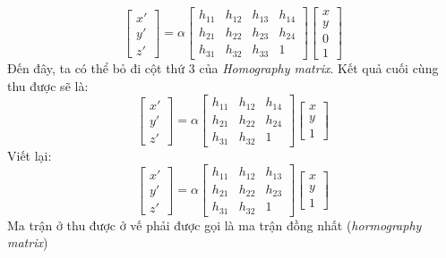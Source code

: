 \documentclass{article}
\begin{document}
\begin{equation}
\begin{bmatrix}
    x'\\y'\\z'
\end{bmatrix} = \alpha \begin{bmatrix}
    h_{11}&h_{12}&h_{13}&h_{14}\\
    h_{21}&h_{22}&h_{23}&h_{24}\\
    h_{31}&h_{32}&h_{33}&1
\end{bmatrix}\begin{bmatrix}
    x\\y\\0\\1
\end{bmatrix}
\label{eq6}
\end{equation}
Đến đây, ta có thể bỏ đi cột thứ 3 của \textit{Homography matrix}. Kết quả cuối cùng thu được sẽ là:
\begin{equation}
\begin{bmatrix}
    x'\\y'\\z'
\end{bmatrix} = \alpha \begin{bmatrix}
    h_{11}&h_{12}&h_{14}\\
    h_{21}&h_{22}&h_{24}\\
    h_{31}&h_{32}&1
\end{bmatrix}\begin{bmatrix}
    x\\y\\1
\end{bmatrix}
\label{eq7}
\end{equation}
Viết lại:
\begin{equation}
\begin{bmatrix}
    x'\\y'\\z'
\end{bmatrix} = \alpha \begin{bmatrix}
    h_{11}&h_{12}&h_{13}\\
    h_{21}&h_{22}&h_{23}\\
    h_{31}&h_{32}&1
\end{bmatrix}\begin{bmatrix}
    x\\y\\1
\end{bmatrix}
\label{eq8}
\end{equation}
Ma trận ở thu được ở vế phải được gọi là ma trận đồng nhất (\textit{hormography matrix})
\end{document}
